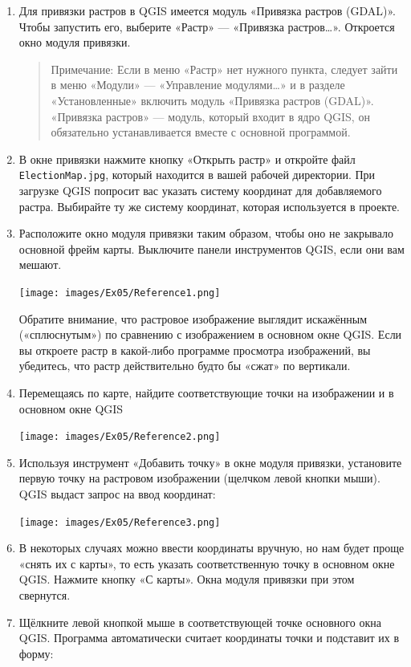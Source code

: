 \documentclass[
  12pt,
]{book}
\begin{document}
\begin{enumerate}
\def\labelenumi{\arabic{enumi}.}
\item
  Для привязки растров в QGIS имеется модуль «Привязка растров (GDAL)». Чтобы запустить его, выберите «Растр» --- «Привязка растров\ldots». Откроется окно модуля привязки.

  \begin{quote}
  Примечание: Если в меню «Растр» нет нужного пункта, следует зайти в меню «Модули» --- «Управление модулями\ldots» и в разделе «Установленные» включить модуль «Привязка растров (GDAL)». «Привязка растров» --- модуль, который входит в ядро QGIS, он обязательно устанавливается вместе с основной программой.
  \end{quote}
\item
  В окне привязки нажмите кнопку «Открыть растр» и откройте файл \texttt{ElectionMap.jpg}, который находится в вашей рабочей директории. При загрузке QGIS попросит вас указать систему координат для добавляемого растра. Выбирайте ту же систему координат, которая используется в проекте.
\item
  Расположите окно модуля привязки таким образом, чтобы оно не закрывало основной фрейм карты. Выключите панели инструментов QGIS, если они вам мешают.

  \texttt{[image: images/Ex05/Reference1.png]}

  Обратите внимание, что растровое изображение выглядит искажённым («сплюснутым») по сравнению с изображением в основном окне QGIS. Если вы откроете растр в какой-либо программе просмотра изображений, вы убедитесь, что растр действительно будто бы «сжат» по вертикали.
\item
  Перемещаясь по карте, найдите соответствующие точки на изображении и в основном окне QGIS

  \texttt{[image: images/Ex05/Reference2.png]}
\item
  Используя инструмент «Добавить точку» в окне модуля привязки, установите первую точку на растровом изображении (щелчком левой кнопки мыши). QGIS выдаст запрос на ввод координат:

  \texttt{[image: images/Ex05/Reference3.png]}
\item
  В некоторых случаях можно ввести координаты вручную, но нам будет проще «снять их с карты», то есть указать соответственную точку в основном окне QGIS. Нажмите кнопку «С карты». Окна модуля привязки при этом свернутся.
\item
  Щёлкните левой кнопкой мыше в соответствующей точке основного окна QGIS. Программа автоматически считает координаты точки и подставит их в форму:


\end{enumerate}
\end{document}
